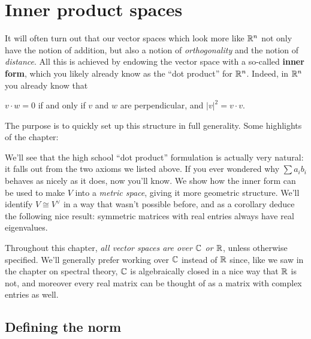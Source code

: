 \chapter{Inner product spaces}
It will often turn out that our vector spaces which look more like $\mathbb R^n$
not only have the notion of addition, but also a notion of \emph{orthogonality}
and the notion of \emph{distance}.
All this is achieved by endowing the vector space with a so-called \textbf{inner form},
which you likely already know as the ``dot product'' for $\mathbb R^n$.
Indeed, in $\mathbb R^n$ you already know that
\begin{itemize}
	\ii $v \cdot w = 0$ if and only if $v$ and $w$ are perpendicular, and
	\ii $|v|^2 = v \cdot v$.
\end{itemize}
The purpose is to quickly set up this structure in full generality.
Some highlights of the chapter:
\begin{itemize}
	\ii We'll see that the high school ``dot product'' formulation is actually very natural:
	it falls out from the two axioms we listed above.
	If you ever wondered why $\sum a_ib_i$ behaves as nicely as it does, now you'll know.
	\ii We show how the inner form can be used to make $V$ into a \emph{metric space},
	giving it more geometric structure.
	\ii We'll identify $V \cong V^\vee$ in a way that wasn't possible before,
	and as a corollary deduce the following nice result:
	symmetric matrices with real entries always have real eigenvalues.
\end{itemize}

Throughout this chapter, \emph{all vector spaces are over $\mathbb C$ or $\mathbb R$},
unless otherwise specified.
We'll generally prefer working over $\mathbb C$ instead of $\mathbb R$ since,
like we saw in the chapter on spectral theory, $\mathbb C$ is algebraically closed
in a nice way that $\mathbb R$ is not,
and moreover every real matrix can be thought of as a matrix with complex entries as well.

\section{Defining the norm}

